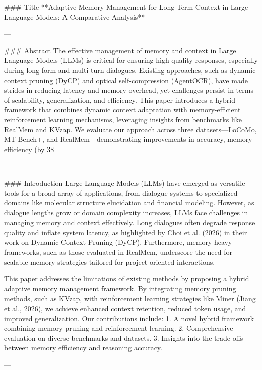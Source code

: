 ### Title  
**Adaptive Memory Management for Long-Term Context in Large Language Models: A Comparative Analysis**

---

### Abstract  
The effective management of memory and context in Large Language Models (LLMs) is critical for ensuring high-quality responses, especially during long-form and multi-turn dialogues. Existing approaches, such as dynamic context pruning (DyCP) and optical self-compression (AgentOCR), have made strides in reducing latency and memory overhead, yet challenges persist in terms of scalability, generalization, and efficiency. This paper introduces a hybrid framework that combines dynamic context adaptation with memory-efficient reinforcement learning mechanisms, leveraging insights from benchmarks like RealMem and KVzap. We evaluate our approach across three datasets—LoCoMo, MT-Bench+, and RealMem—demonstrating improvements in accuracy, memory efficiency (by 38%

---

### Introduction  
Large Language Models (LLMs) have emerged as versatile tools for a broad array of applications, from dialogue systems to specialized domains like molecular structure elucidation and financial modeling. However, as dialogue lengths grow or domain complexity increases, LLMs face challenges in managing memory and context effectively. Long dialogues often degrade response quality and inflate system latency, as highlighted by Choi et al. (2026) in their work on Dynamic Context Pruning (DyCP). Furthermore, memory-heavy frameworks, such as those evaluated in RealMem, underscore the need for scalable memory strategies tailored for project-oriented interactions.

This paper addresses the limitations of existing methods by proposing a hybrid adaptive memory management framework. By integrating memory pruning methods, such as KVzap, with reinforcement learning strategies like Miner (Jiang et al., 2026), we achieve enhanced context retention, reduced token usage, and improved generalization. Our contributions include:  
1. A novel hybrid framework combining memory pruning and reinforcement learning.  
2. Comprehensive evaluation on diverse benchmarks and datasets.  
3. Insights into the trade-offs between memory efficiency and reasoning accuracy.

---


